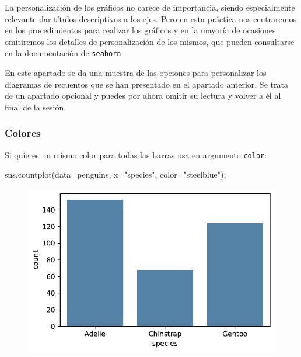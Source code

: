 \documentclass[
  a4paper,
  noprof,
  12pt,
  notoc,
  nosols,
  nobib]{mnye}
\newenvironment{Shaded}{\begin{snugshade}}{\end{snugshade}}
\newcommand{\NormalTok}[1]{\textcolor[rgb]{0.00,0.23,0.31}{#1}}
\newcommand{\OperatorTok}[1]{\textcolor[rgb]{0.37,0.37,0.37}{#1}}
\newcommand{\StringTok}[1]{\textcolor[rgb]{0.13,0.47,0.30}{#1}}
\theoremstyle{definition}
\theoremstyle{remark}
\begin{document}
La personalización de los gráficos no carece de importancia, siendo
especialmente relevante dar títulos descriptivos a los ejes. Pero en
esta práctica nos centraremos en los procedimientos para realizar los
gráficos y en la mayoría de ocasiones omitiremos los detalles de
personalización de los mismos, que pueden consultarse en la
documentación de \texttt{seaborn}.

En este apartado se da una muestra de las opciones para personalizar los
diagramas de recuentos que se han presentado en el apartado anterior. Se
trata de un apartado opcional y puedes por ahora omitir su lectura y
volver a él al final de la sesión.

\hypertarget{colores}{%
\subsubsection{Colores}\label{colores}}

Si quieres un mismo color para todas las barras usa en argumento
\texttt{color}:

\begin{Shaded}
\begin{Highlighting}[]
\NormalTok{sns.countplot(data}\OperatorTok{=}\NormalTok{penguins, x}\OperatorTok{=}\StringTok{"species"}\NormalTok{, color}\OperatorTok{=}\StringTok{"steelblue"}\NormalTok{)}\OperatorTok{;}
\end{Highlighting}
\end{Shaded}

\begin{figure}[tbph]

{\centering \includegraphics{chapters/1categorical_files/figure-pdf/cell-8-output-1.pdf}

}

\end{figure}
\end{document}
